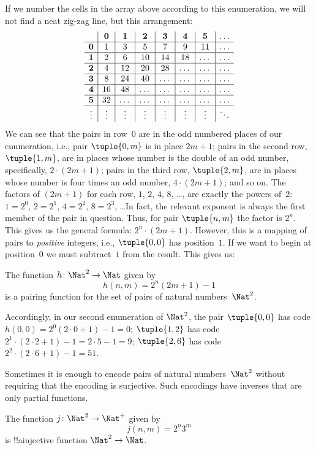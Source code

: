 \documentclass[../../../include/open-logic-section]{subfiles}
\begin{document}
\begin{explain}
\[\]
If we number the cells in the array above according to this
enumeration, we will not find a neat zig-zag line, but this
arrangement:
\[
\begin{array}{ c | c | c | c | c | c | c | c }
& \mathbf 0 & \mathbf 1 & \mathbf 2 & \mathbf 3 & \mathbf 4 & \mathbf 5 & \dots \\
\hline
\mathbf 0 & 1 & 3 & 5 & 7 & 9 & 11 & \dots \\
\hline
\mathbf 1 & 2 & 6 & 10 & 14 & 18 & \dots & \dots \\
\hline
\mathbf 2 & 4 & 12 & 20 & 28 & \dots & \dots & \dots \\
\hline
\mathbf 3 & 8 & 24 & 40 & \dots & \dots & \dots & \dots \\
\hline
\mathbf 4 & 16 & 48 & \dots & \dots & \dots & \dots & \dots \\
\hline
\mathbf 5 & 32 & \dots & \dots & \dots & \dots & \dots & \dots \\
\hline
\vdots & \vdots & \vdots & \vdots & \vdots & \vdots & \vdots & \ddots\\
\end{array}
\]
We can see that the pairs in row~$0$ are in the odd numbered places of
our enumeration, i.e., pair $\tuple{0,m}$ is in place $2m+1$; pairs in
the second row, $\tuple{1,m}$, are in places whose number is the
double of an odd number, specifically,  $2 \cdot (2m+1)$; pairs in the
third row, $\tuple{2,m}$, are in places whose number is four times an
odd number, $4 \cdot (2m+1)$; and so on. The factors of $(2m+1)$ for
each row, $1$, $2$, $4$, $8$, \dots, are exactly the powers of~$2$:
$1= 2^0$, $2 = 2^1$, $4 = 2^2$, $8 = 2^3$, \dots\@ In fact, the
relevant exponent is always the first member of the pair in
question. Thus, for pair $\tuple{n,m}$ the factor is $2^n$.  This
gives us the general formula: $2^n \cdot (2m+1)$. However, this is a
mapping of pairs to \emph{positive} integers, i.e., $\tuple{0,0}$ has
position~$1$. If we want to begin at position~$0$ we must subtract~$1$
from the result. This gives us:
\end{explain}

\begin{ex}
The function $h\colon \Nat^2 \to \Nat$ given by
\[
h(n,m) = 2^n (2m+1) - 1
\]
is a pairing function for the set of pairs of natural numbers~$\Nat^2$.
\end{ex}

\begin{explain}
Accordingly, in our second enumeration of $\Nat^2$, the pair
$\tuple{0,0}$ has code $h(0,0) = 2^0(2\cdot 0+1) - 1 = 0$;
$\tuple{1,2}$ has code $2^{1} \cdot (2 \cdot 2 + 1) - 1 = 2
\cdot 5 - 1 = 9$; $\tuple{2,6}$ has code $2^{2} \cdot (2
\cdot 6 + 1) - 1 = 51$.
\end{explain}

Sometimes it is enough to encode pairs of natural numbers~$\Nat^2$
without requiring that the encoding is surjective. Such encodings have
inverses that are only partial functions. 

\begin{ex}
The function $j\colon \Nat^2 \to \Nat^+$ given by
\[
j(n,m) = 2^n3^m
\]
is !!a{injective} function $\Nat^2 \to \Nat$.
\end{ex}
\end{document}
